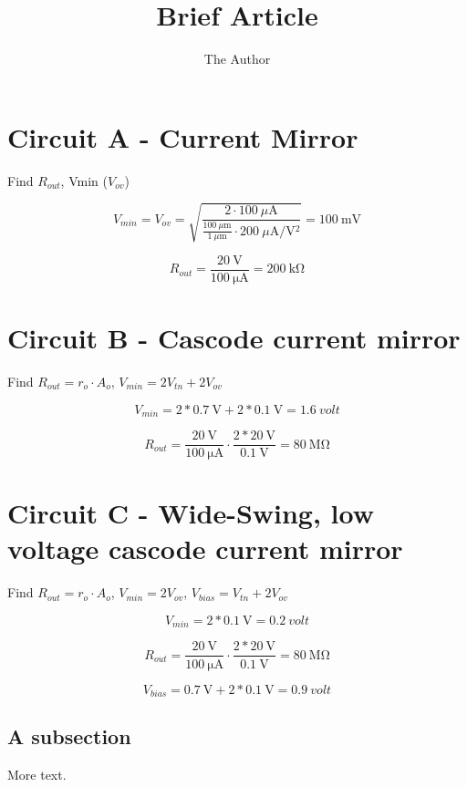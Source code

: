 \documentclass[11pt]{article} %
\title{Brief Article}
\author{The Author}
\begin{document}
\maketitle

\section{Circuit A - Current Mirror}

Find $R_{out}$, Vmin ($V_{ov}$)

$$V_{min}=V_{ov}=\sqrt{\frac{2\cdot\SI{100}{\mu\ampere}}{\frac{\SI{100}{\mu\meter}}{\SI{1}{\mu\meter}}\cdot\SI{200}{\mu\ampere/\volt^2}}} = \SI{100}{\mV}$$

$$R_{out} = \frac{\SI{20}{\volt}}{\SI{100}{\uA}} = \SI{200}{\kohm}$$

\section{Circuit B - Cascode current mirror}

Find $R_{out}= r_o\cdot A_o$, $V_{min} = 2V_{tn} + 2V_{ov}$

$$V_{min} = 2*\SI{0.7}{\volt} + 2*\SI{0.1}{\volt} = \SI{1.6}{volt}$$

$$R_{out} = \frac{\SI{20}{\volt}}{\SI{100}{\uA}} \cdot \frac{2*\SI{20}{\volt}}{\SI{0.1}{\volt}}= \SI{80}{\Mohm}$$


\section{Circuit C - Wide-Swing, low voltage cascode current mirror}

Find $R_{out}= r_o\cdot A_o$, $V_{min} = 2V_{ov}$, $V_{bias} = V_{tn} + 2V_{ov}$



$$V_{min} = 2*\SI{0.1}{\volt} = \SI{0.2}{volt}$$

$$R_{out} = \frac{\SI{20}{\volt}}{\SI{100}{\uA}} \cdot \frac{2*\SI{20}{\volt}}{\SI{0.1}{\volt}}= \SI{80}{\Mohm}$$

$$V_{bias} = \SI{0.7}{\volt} + 2*\SI{0.1}{\volt} = \SI{0.9}{volt}$$

























































\subsection{A subsection}

More text.
\end{document}
